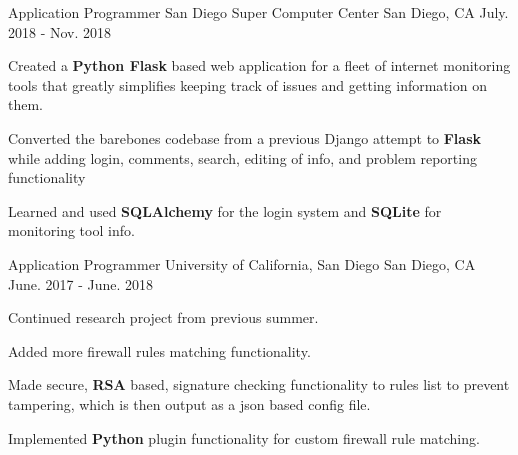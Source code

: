 

\begin{cventries}

  \cventry
    {Application Programmer} %
    {San Diego Super Computer Center} %
    {San Diego, CA} %
    {July. 2018 - Nov. 2018} %
    {
      \begin{cvitems} %
        \item {Created a \textbf{Python Flask} based web application for a fleet of internet monitoring tools that greatly simplifies keeping track of issues and getting information on them.}
        \item {Converted the barebones codebase from a previous Django attempt to \textbf{Flask} while adding login, comments, search, editing of info, and problem reporting functionality}
        \item {Learned and used \textbf{SQLAlchemy} for the login system and \textbf{SQLite} for monitoring tool info.}
      \end{cvitems}
    }

  \cventry
    {Application Programmer} %
    {University of California, San Diego} %
    {San Diego, CA} %
    {June. 2017 - June. 2018} %
    {
      \begin{cvitems} %
       \item {Continued research project from previous summer.}
        \item {Added more firewall rules matching functionality.}
        \item {Made secure, \textbf{RSA} based, signature checking functionality to rules list to prevent tampering, which is then output as a json based config file.}
        \item {Implemented \textbf{Python} plugin functionality for custom firewall rule matching.} \end{cvitems}
    }


\end{cventries}
